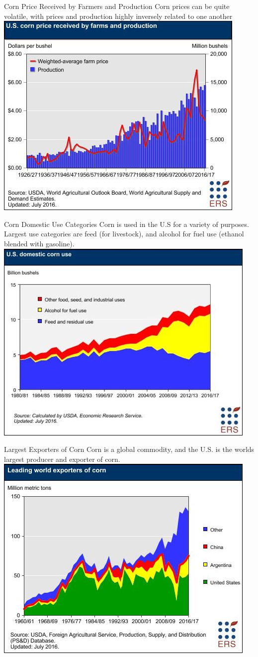 \documentclass{beamer}
\begin{document}
\begin{frame}{Corn Price Received by Farmers and Production}
Corn prices can be quite volatile, with prices and production highly inversely related to one another
\includegraphics[width=.75\textwidth]{Corn-PriceR-Production.png}
\end{frame}

\begin{frame}{Corn Domestic Use Categories}
Corn is used in the U.S for a variety of purposes. Largest use categories are feed (for livestock), and alcohol for fuel use (ethanol blended with gasoline).
\includegraphics[width=.75\textwidth]{Corn-Domestic-Use.png}
\end{frame}

\begin{frame}{Largest Exporters of Corn}
Corn is a global commodity, and the U.S. is the worlds largest producer and exporter of corn. 
\includegraphics[width=.75\textwidth]{Corn-World-Exporters.png}
\end{frame}
\end{document}
